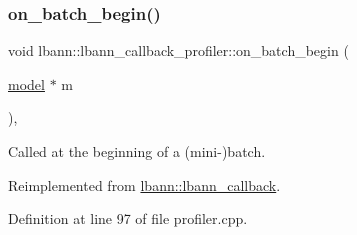 \subsubsection{\texorpdfstring{on\+\_\+batch\+\_\+begin()}{on\_batch\_begin()}}
{\footnotesize\ttfamily void lbann\+::lbann\+\_\+callback\+\_\+profiler\+::on\+\_\+batch\+\_\+begin (\begin{DoxyParamCaption}\item[{\hyperlink{classlbann_1_1model}{model} $\ast$}]{m }\end{DoxyParamCaption})\hspace{0.3cm}{\ttfamily [override]}, {\ttfamily [virtual]}}

Called at the beginning of a (mini-\/)batch. 

Reimplemented from \hyperlink{classlbann_1_1lbann__callback_a9ecf4e44cd4021cdd687de14c850cc83}{lbann\+::lbann\+\_\+callback}.



Definition at line 97 of file profiler.\+cpp.



